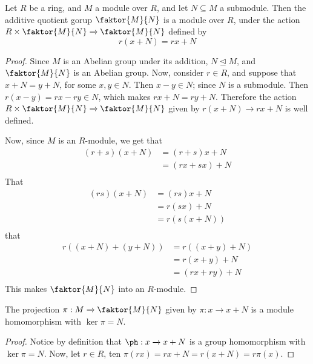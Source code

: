\begin{lemma}\label{lemma_4.2.3}
    Let $R$ be a ring, and $M$ a module over $R$, and let $N \subseteq M$ a
    submodule. Then the additive quotient gorup  $\faktor{M}{N}$ is a module
    over $R$, under the action  $R \times \faktor{M}{N} \xrightarrow{}
    \faktor{M}{N}$ defined by
    \begin{equation*}
        r(x+N)=rx+N
    \end{equation*}
\end{lemma}
\begin{proof}
    Since $M$ is an Abelian group under its addition,  $N \unlhd M$, and
    $\faktor{M}{N}$ is an Abelian group. Now, consider $r \in R$, and suppose
    that  $x+N=y+N$, for some  $x,y \in N$. Then  $x-y \in N$; since $N$ is a
    submodule. Then $r(x-y)=rx-ry \in N$, which makes $rx+N=ry+N$. Therefore the
    action  $R \times \faktor{M}{N} \xrightarrow{} \faktor{M}{N}$ given by
    $r(x+N) \xrightarrow{} rx+N$ is well defined.

    Now, since $M$ is an $R$-module, we get that
    \begin{align*}
        (r+s)(x+N)  &=  (r+s)x+N    \\
                    &=  (rx+sx)+N   \\
    \end{align*}
    That
    \begin{align*}
        (rs)(x+N)   &=  (rs)x+N \\
                    &=  r(sx)+N \\
                    &= r(s(x+N))    \\
    \end{align*}
    that
    \begin{align*}
        r((x+N)+(y+N))  &=  r((x+y)+N)  \\
                        &=  r(x+y)+N    \\
                        &=  (rx+ry)+N   \\
    \end{align*}
    This makes $\faktor{M}{N}$ into an $R$-module.
\end{proof}
\begin{corollary}
    The projection $\pi:M \xrightarrow{} \faktor{M}{N}$ given by $\pi:x
    \xrightarrow{} x+N$ is a module homomorphism with $\ker{\pi}=N$.
\end{corollary}
\begin{proof}
    Notice by definition that $\ph:x \xrightarrow{} x+N$ is a group homomorphism
    with $\ker{\pi}=N$. Now, let $r \in R$, ten  $\pi(rx)=rx+N=r(x+N)=r\pi(x)$.
\end{proof}

